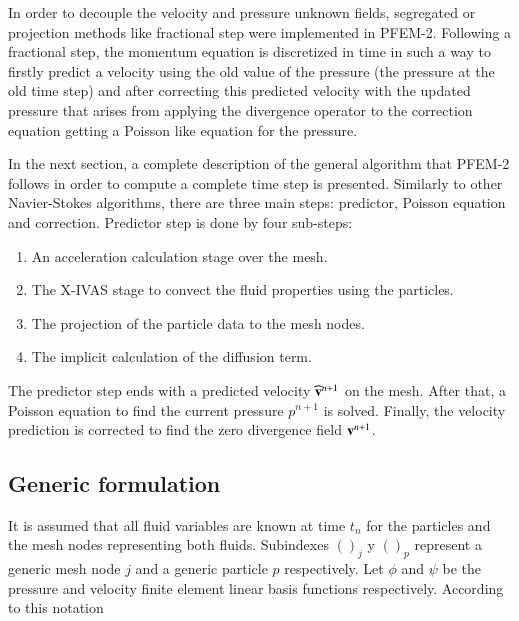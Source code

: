 In order to decouple the velocity and pressure unknown fields, segregated or projection methods like fractional step were implemented in PFEM-2. Following a fractional step, the momentum equation is discretized in time in such a way to firstly predict a velocity using the old value of the pressure (the pressure at the old time step) and after correcting this predicted velocity with the updated pressure that arises from applying the divergence operator to the correction equation getting a Poisson like equation for the pressure.

In the next section, a complete description of the general algorithm that PFEM-2 follows in order to compute a complete time step is presented. Similarly to other Navier-Stokes algorithms, there are three main steps: predictor, Poisson equation and correction. Predictor step is done by four sub-steps:

\begin{enumerate}
  \item An acceleration calculation stage over the mesh.
  \item The X-IVAS stage to convect the fluid properties using the particles.
  \item The projection of the particle data to the mesh nodes.
  \item The implicit calculation of the diffusion term.
\end{enumerate}

The predictor step ends with a predicted velocity $\widehat{\mathbf{v}}^{n+1}$ on the mesh. After that, a Poisson equation to find the current pressure $p^{n+1}$ is solved. Finally, the velocity prediction is corrected to find the zero divergence field $\mathbf{v}^{n+1}$.

\subsection{Generic formulation}\label{GeneralFor}

It is assumed that all fluid variables are known at time $t_n$ for the particles and the mesh nodes representing both fluids. Subindexes $()_j$ y $()_p$ represent a generic mesh node $j$ and a generic particle $p$ respectively. Let $\phi$ and $\psi$ be the pressure and velocity finite element linear basis functions respectively. According to this notation

